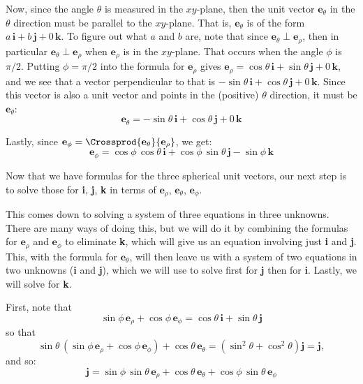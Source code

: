 {Now, since the angle $\theta$ is measured in the $xy$-plane, then the unit vector $\textbf{e}_{\theta}$ in the $\theta$ direction must be parallel to the $xy$-plane. That is, $\textbf{e}_{\theta}$ is of the form $a\,\textbf{i} + b\,\textbf{j} + 0\,\textbf{k}$. To figure out what $a$ and $b$ are, note that since $\textbf{e}_{\theta} \perp \textbf{e}_{\rho}$, then in particular $\textbf{e}_{\theta} \perp \textbf{e}_{\rho}$ when $\textbf{e}_{\rho}$ is in the $xy$-plane. That occurs when the angle $\phi$ is $\pi/2$. Putting $\phi = \pi/2$ into the formula for $\textbf{e}_{\rho}$ gives $\textbf{e}_{\rho} = \cos\theta\,\textbf{i} + \sin\theta\,\textbf{j} + 0\,\textbf{k}$, and we see that a vector perpendicular to that is $-\sin\theta\,\textbf{i} + \cos\theta\,\textbf{j} + 0\,\textbf{k}$. Since this vector is also a unit vector and points in the (positive) $\theta$ direction, it must be $\textbf{e}_{\theta}$:
\begin{equation}
 \textbf{e}_{\theta} = -\sin\theta\,\textbf{i} + \cos\theta\,\textbf{j} + 0\,\textbf{k}
\end{equation}

Lastly, since $\textbf{e}_{\phi}=\Crossprod{\textbf{e}_{\theta}}{\textbf{e}_{\rho}}$, we get:
\begin{equation}
 \textbf{e}_{\phi} = \cos\phi\,\cos\theta\,\textbf{i} + \cos\phi\,\sin\theta\,\textbf{j} - \sin\phi\,\textbf{k}
\end{equation}

Now that we have formulas for the three spherical unit vectors, our next step is to solve those for \textbf{i}, \textbf{j}, \textbf{k} in terms of $\textbf{e}_{\rho}$, $\textbf{e}_{\theta}$, $\textbf{e}_{\phi}$.

This comes down to solving a system of three equations in three unknowns. There are many ways of doing this, but we will do it by combining the formulas for $\textbf{e}_{\rho}$ and $\textbf{e}_{\phi}$ to eliminate \textbf{k}, which will give us an equation involving just \textbf{i} and \textbf{j}. This, with the formula for $\textbf{e}_{\theta}$, will then leave us with a system of two equations in two unknowns (\textbf{i} and \textbf{j}), which we will use to solve first for \textbf{j} then for \textbf{i}. Lastly, we will solve for \textbf{k}.

First, note that
\[
 \sin\phi\,\textbf{e}_{\rho} + \cos\phi\,\textbf{e}_{\phi} = \cos\theta\,\textbf{i} + \sin\theta\,\textbf{j}
\]
so that
\[
 \sin\theta\,(\sin\phi\,\textbf{e}_{\rho} + \cos\phi\,\textbf{e}_{\phi}) + \cos\theta\,\textbf{e}_{\theta} =
  (\sin^2 \theta + \cos^2 \theta)\textbf{j} = \textbf{j} ,
\]
and so:
\begin{equation}\label{j_sphere}
 \textbf{j} = \sin\phi\,\sin\theta\,\textbf{e}_{\rho} + \cos\theta\,\textbf{e}_{\theta} + \cos\phi\,\sin\theta\,\textbf{e}_{\phi}
\end{equation}

}

